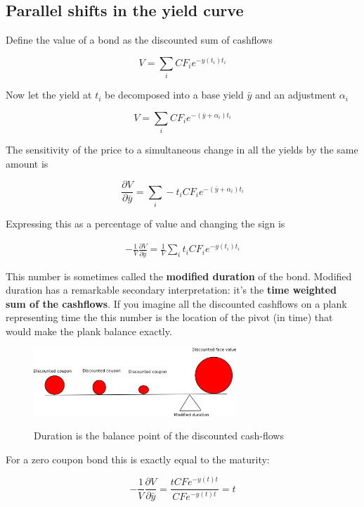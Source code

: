 \subsection{Parallel shifts in the yield curve}

Define the value of a bond as the discounted sum of cashflows

\[V = \sum_i CF_i e^{-y(t_i)t_i} \]

Now let the yield at $t_i$ be decomposed into a base yield $\bar{y}$ and an adjustment $\alpha_i$

\[V = \sum_i CF_i e^{-(\bar{y}+\alpha_i)t_i} \]

The sensitivity of the price to a simultaneous change in all the yields by the same amount is

\[ \frac{\partial V}{\partial \bar{y}} = \sum_i -t_i CF_i e^{-(\bar{y}+\alpha_i)t_i} \]

Expressing this as a percentage of value and changing the sign is 

\begin{eqnarray*}
 -\frac{1}{V}  \frac{\partial V}{\partial \bar{y}} = \frac{1}{V} \sum_i t_i CF_i e^{-y(t_i)t_i} 
 \end{eqnarray*}

This number is sometimes called the \textbf{modified duration} of the bond. Modified duration has a remarkable secondary interpretation: it's the \textbf{time weighted sum of the cashflows}.  If you imagine all the discounted cashflows on a plank representing time the this number is the location of the pivot (in time) that would make the plank balance exactly. 

\begin{figure}[htbp]
\begin{center}
  \includegraphics[width=3in]{pics/modDurn.png} \\
  \caption{Duration is the balance point of the discounted cash-flows}
\label{modDurn}
\end{center}
\end{figure}

For a zero coupon bond this is exactly equal to the maturity:

 \[-\frac{1}{V}  \frac{\partial V}{\partial \bar{y}}  = \frac{t CF e^{-y(t)t}}{CF e^{-y(t)t}} = t \]
 
